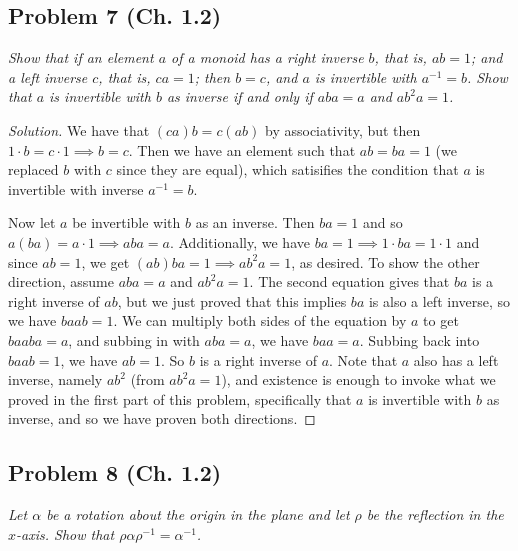 \documentclass{article}
\begin{document}
\subsection*{Problem 7 (Ch. 1.2)}
{\it Show that if an element $a$ of a monoid has a right inverse $b$,
that is, $ab = 1$;
and a left inverse $c$, that is, $ca = 1$;
then $b = c$, and $a$ is invertible with $a^{-1} = b$.
Show that $a$ is invertible with $b$ as inverse if and only if $aba = a$ and $ab^2a=1$.}

\begin{proof}[Solution]\let\qed\relax
	We have that $(ca)b = c(ab)$ by associativity,
	but then $1\cdot b = c \cdot 1 \implies b = c$.
	Then we have an element such that $ab = ba = 1$
	(we replaced $b$ with $c$ since they are equal),
	which satisifies the condition that $a$ is invertible with inverse $a^{-1} = b$.

	Now let $a$ be invertible with $b$ as an inverse.
	Then $ba = 1$ and so $a(ba) = a\cdot 1 \implies aba = a$.
	Additionally, we have $ba = 1 \implies 1\cdot ba = 1 \cdot 1$
	and since $ab = 1$, we get $(ab)ba = 1 \implies ab^2a = 1$, as desired.
	To show the other direction, assume $aba = a$ and $ab^2a = 1$.
	The second equation gives that $ba$ is a right inverse of $ab$,
	but we just proved that this implies $ba$ is also a left inverse,
	so we have $baab = 1$.
	We can multiply both sides of the equation by $a$ to get $baaba = a$,
	and subbing in with $aba = a$, we have $baa = a$.
	Subbing back into $baab = 1$, we have $ab = 1$.
	So $b$ is a right inverse of $a$.
	Note that $a$ also has a left inverse, namely $ab^2$ (from $ab^2a = 1$),
	and existence is enough to invoke what we proved in the first part of this problem,
	specifically that $a$ is invertible with $b$ as inverse,
	and so we have proven both directions.
\end{proof}

\subsection*{Problem 8 (Ch. 1.2)}
{\it Let $\alpha$ be a rotation about the origin in the plane
and let $\rho$ be the reflection in the $x$-axis.
Show that $\rho \alpha \rho^{-1} = \alpha^{-1}$.}
\end{document}
